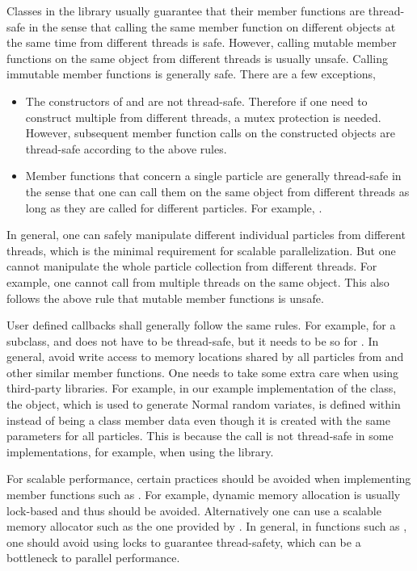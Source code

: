 \documentclass[11pt, bib, hyper, mint, minted=cache]{marticle}
\begin{document}
Classes in the \vsmc library usually guarantee that their member functions are
thread-safe in the sense that calling the same member function on different
objects at the same time from different threads is safe. However, calling
mutable member functions on the same object from different threads is usually
unsafe. Calling immutable member functions is generally safe. There are a few
exceptions,
\begin{itemize}
  \item The constructors of  and  are
    not thread-safe. Therefore if one need to construct multiple
     from different threads, a mutex protection is needed.
    However, subsequent member function calls on the constructed objects are
    thread-safe according to the above rules.
  \item Member functions that concern a single particle are generally
    thread-safe in the sense that one can call them on the same object from
    different threads as long as they are called for different particles. For
    example, .
\end{itemize}
In general, one can safely manipulate different individual particles from
different threads, which is the minimal requirement for scalable
parallelization. But one cannot manipulate the whole particle collection from
different threads. For example, one cannot call
 from multiple threads on the same
object. This also follows the above rule that mutable member functions is
unsafe.

User defined callbacks shall generally follow the same rules. For example, for
a  subclass,  and
 does not have to be thread-safe, but it needs to be
so for . In general, avoid write access to memory
locations shared by all particles from  and other
similar member functions. One needs to take some extra care when using
third-party libraries. For example, in our example implementation of the
 class, the  object, which is used to
generate Normal random variates, is defined within 
instead of being a class member data even though it is created with the same
parameters for all particles. This is because the call
 is not thread-safe in some implementations, for
example, when using the \lboost library.

For scalable performance, certain practices should be avoided when
implementing member functions such as . For example,
dynamic memory allocation is usually lock-based and thus should be avoided.
Alternatively one can use a scalable memory allocator such as the one provided
by \ltbb. In general, in functions such as , one should
avoid using locks to guarantee thread-safety, which can be a bottleneck to
parallel performance.
\end{document}
